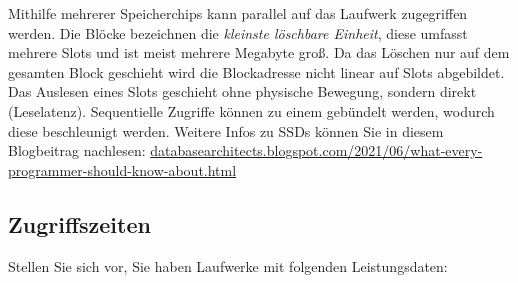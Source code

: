 \begin{solution}
	Mithilfe mehrerer Speicherchips kann parallel auf das Laufwerk zugegriffen werden.
	Die Blöcke bezeichnen die \textit{kleinste löschbare Einheit}, diese umfasst mehrere Slots und ist meist mehrere Megabyte groß.
	Da das Löschen nur auf dem gesamten Block geschieht wird die  Blockadresse nicht linear auf Slots abgebildet.
	Das Auslesen eines Slots geschieht ohne physische Bewegung, sondern direkt (Leselatenz).
	Sequentielle Zugriffe können zu einem gebündelt werden, wodurch diese beschleunigt werden.
	Weitere Infos zu SSDs können Sie in diesem Blogbeitrag nachlesen: \href{http://databasearchitects.blogspot.com/2021/06/what-every-programmer-should-know-about.html}{databasearchitects.blogspot.com/2021/06/what-every-programmer-should-know-about.html}
\end{solution}

\beamertxt{\pagebreak}
\subsection{Zugriffszeiten}
\label{ZugriffFestplatten}
Stellen Sie sich vor, Sie haben Laufwerke mit folgenden Leistungsdaten:

